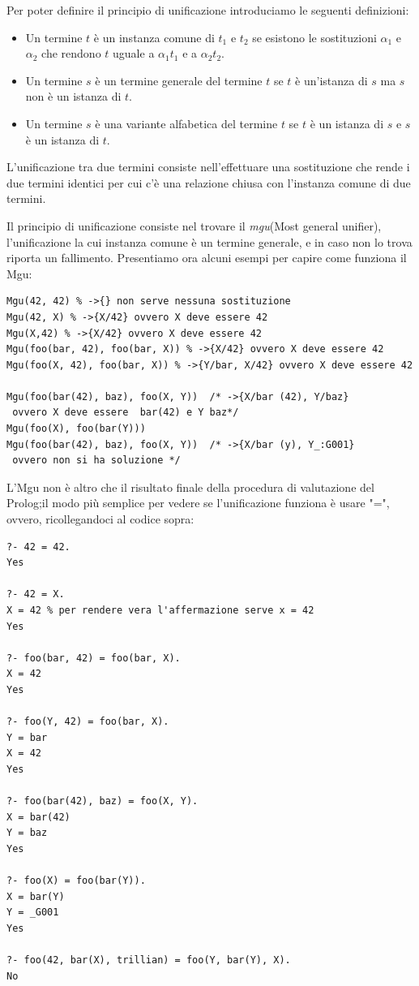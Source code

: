 \documentclass[a4paper]{report}
\begin{document}
Per poter definire il principio di unificazione introduciamo le seguenti definizioni:
\begin{itemize}
  \item Un termine $t$ è un instanza comune  di $t_1$ e $t_2$ se esistono le sostituzioni $\alpha_1$ e $\alpha_2$
        che rendono $t$ uguale a $\alpha_1t_1$ e a $\alpha_2t_2$.
  \item Un termine $s$ è un termine generale del termine $t$ se $t$ è un'istanza di $s$ ma $s$ non è un istanza di $t$.

  \item Un termine $s$ è una variante alfabetica del termine $t$ se $t$ è un istanza di $s$ e $s$ è un istanza di $t$.
\end{itemize}
L'unificazione tra due termini consiste nell'effettuare una sostituzione che rende i due termini identici
per cui c'è una relazione chiusa con l'instanza comune di due termini.

Il principio di unificazione consiste nel trovare il \emph{mgu}(Most general unifier),
l'unificazione la cui instanza comune è un termine generale, e in caso non lo trova riporta un fallimento.
Presentiamo ora alcuni esempi per capire come funziona il Mgu:
\begin{verbatim}
Mgu(42, 42) % ->{} non serve nessuna sostituzione
Mgu(42, X) % ->{X/42} ovvero X deve essere 42
Mgu(X,42) % ->{X/42} ovvero X deve essere 42
Mgu(foo(bar, 42), foo(bar, X)) % ->{X/42} ovvero X deve essere 42
Mgu(foo(X, 42), foo(bar, X)) % ->{Y/bar, X/42} ovvero X deve essere 42

Mgu(foo(bar(42), baz), foo(X, Y))  /* ->{X/bar (42), Y/baz}
 ovvero X deve essere  bar(42) e Y baz*/
Mgu(foo(X), foo(bar(Y))) 
Mgu(foo(bar(42), baz), foo(X, Y))  /* ->{X/bar (y), Y_:G001}
 ovvero non si ha soluzione */
\end{verbatim}
L'Mgu non è altro che il risultato finale della procedura di valutazione del Prolog;il modo più semplice per vedere
se l'unificazione funziona è usare "=", ovvero, ricollegandoci al codice sopra:
\begin{verbatim}
?- 42 = 42.
Yes

?- 42 = X.
X = 42 % per rendere vera l'affermazione serve x = 42
Yes

?- foo(bar, 42) = foo(bar, X).
X = 42
Yes

?- foo(Y, 42) = foo(bar, X).
Y = bar
X = 42
Yes

?- foo(bar(42), baz) = foo(X, Y).
X = bar(42)
Y = baz
Yes

?- foo(X) = foo(bar(Y)).
X = bar(Y)
Y = _G001
Yes

?- foo(42, bar(X), trillian) = foo(Y, bar(Y), X).
No
\end{verbatim}
\end{document}
